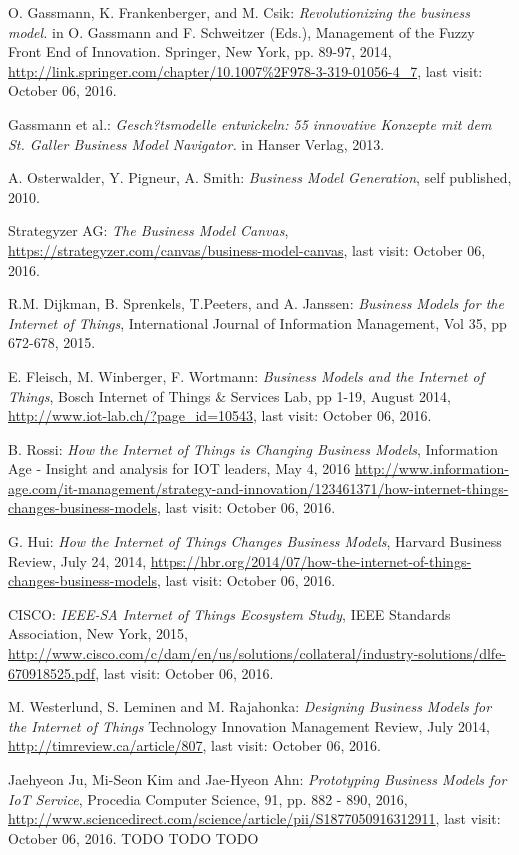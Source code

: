  \begin{thebibliography}{99}
	  O. Gassmann, K. Frankenberger, and M. Csik: \emph{Revolutionizing the business model.} in O. Gassmann and F. Schweitzer (Eds.), Management of the Fuzzy Front End of Innovation. Springer, New York, pp. 89-97, 2014, \url{http://link.springer.com/chapter/10.1007%2F978-3-319-01056-4_7}, last visit: October 06, 2016.

	  Gassmann et al.: \emph{Gesch?tsmodelle entwickeln: 55 innovative Konzepte mit dem St. Galler Business Model Navigator.} in Hanser Verlag, 2013.

	  A. Osterwalder, Y. Pigneur, A. Smith: \emph{Business Model Generation}, self published, 2010.

	  Strategyzer AG: \emph{The Business Model Canvas}, \url{https://strategyzer.com/canvas/business-model-canvas}, last visit: October 06, 2016.

	  R.M. Dijkman, B. Sprenkels, T.Peeters, and A. Janssen: \emph{Business Models for the Internet of Things}, International Journal of Information Management, Vol 35, pp 672-678, 2015.

	  E. Fleisch, M. Winberger, F. Wortmann: \emph{Business Models and the Internet of Things}, Bosch Internet of Things \& Services Lab, pp 1-19, August 2014, \url{http://www.iot-lab.ch/?page_id=10543}, last visit: October 06, 2016.

	  B. Rossi: \emph{How the Internet of Things is Changing Business Models}, Information Age - Insight and analysis for IOT leaders, May 4, 2016 \url{http://www.information-age.com/it-management/strategy-and-innovation/123461371/how-internet-things-changes-business-models}, last visit: October 06, 2016.

	  G. Hui: \emph{How the Internet of Things Changes Business Models}, Harvard Business Review, July 24, 2014, \url{https://hbr.org/2014/07/how-the-internet-of-things-changes-business-models}, last visit: October 06, 2016.

	  CISCO: \emph{IEEE-SA Internet of Things Ecosystem Study}, IEEE Standards Association, New York, 2015, \url{http://www.cisco.com/c/dam/en/us/solutions/collateral/industry-solutions/dlfe-670918525.pdf}, last visit: October 06, 2016.

	 M. Westerlund, S. Leminen and M. Rajahonka: \emph{Designing Business Models for the Internet of Things} Technology Innovation Management Review, July 2014, \url{http://timreview.ca/article/807}, last visit: October 06, 2016.

	 Jaehyeon Ju, Mi-Seon Kim and Jae-Hyeon Ahn: \emph{Prototyping Business Models for IoT Service}, Procedia Computer Science, 91, pp. 882 - 890, 2016, \url{http://www.sciencedirect.com/science/article/pii/S1877050916312911}, last visit: October 06, 2016.
	 TODO
	 TODO
	 TODO
 \end{thebibliography}

